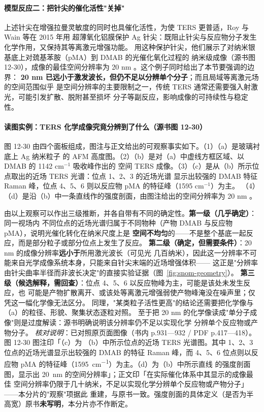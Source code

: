 \paragraph{模型反应二：把针尖的催化活性"关掉"}
上述针尖在增强拉曼灵敏度的同时也具催化活性，为使 TERS 更普适，Roy 与 Wain 等在 2015 年用
超薄氧化铝膜保护 Ag 针尖：既阻止针尖与反应物分子发生化学作用，又保持其等离激元增强功能。
用这种保护针尖，他们展示了对纳米银基底上对巯基苯胺（pMA）到 DMAB 的光催化氧化过程的
纳米级成像（源书图 12-30），成像的最佳空间分辨率为 20 nm
。这个例子同时给出了本节要强调的边界：
\textbf{20 nm 已远小于激发波长，但仍不足以分辨单个分子}；而且局域等离激元场的空间范围似乎
是空间分辨率的主要限制之一，传统 TERS 通常还需要强入射激光，可能引发扩散、脱附甚至损坏
分子等副反应，影响成像的可持续性与稳定性。

\paragraph{读图实例：TERS 化学成像究竟分辨到了什么（源书图 12-30）}
\begin{obs}
图 12-30 由四个面板组成，图注与正文给出的可观察事实如下。（1）（a）是玻璃衬底上 Ag 纳米粒子
的 AFM 高度图。（2）（b）是对（a）中虚线方框区域、以 DMAB 的 1142 cm$^{-1}$ 吸收峰作出的
空间 TERS 成像。（3）（c）是从（b）所示位点取出的近场 TERS 光谱：位点 1、2、3 的近场光谱
显示出较强的 DMAB 特征 Raman 峰，位点 4、5、6 则以反应物 pMA 的特征峰（1595 cm$^{-1}$）为主。
（4）（d）是沿（b）中一条直线作的强度剖面，由图注给出的空间分辨率为 20 nm
。
\end{obs}
\begin{infer}
由以上观察可以作出三级推断，并各自带有不同的确定性。\textbf{第一级（几乎确定）}：同一视场内
不同位点的近场光谱归属于不同物种（产物 DMAB 与反应物 pMA），说明光催化转化在纳米尺度上是
\textbf{空间不均匀}的——不是整个基底一起反应，而是部分粒子或部分位点上发生了反应。
\textbf{第二级（确定，但需要条件）}：20 nm 的成像分辨率\textbf{远小于}所用激光波长（可见光
几百纳米），因此这一分辨率不可能来自光学成像系统本身，只能来自针尖末端的近场增强体积——
这正是"分辨率由针尖曲率半径而非波长决定"的直接实验证据（图~\ref{fig:snom-geometry}）。
\textbf{第三级（候选解释，需回查）}：位点 4、5、6 以反应物峰为主，可能是该处未发生反应，也
可能是产物扩散离开、或该处等离激元增强弱使产物峰淹没在噪声里；仅凭这一幅化学像无法区分。
同理，"某类粒子活性更高"的结论还需要把化学像与（a）的粒径、形貌、聚集状态逐粒对照。
至于把 20 nm 的化学像读成"单分子成像"则是过度解读：源书明确说明该分辨率仍不足以实现化学
分辨单个反应物或产物分子。
\emph{核对说明}：已对照原页面图像（书内 p.931—932 / PDF p.417—418）。图 12-30 图注印「（c）为
（b）中所示位点的近场 TERS 光谱图。其中 1、2、3 位点的近场光谱显示出较强的 DMAB 的特征 Raman
峰，而 4、5、6 位点则以反应物 pMA 的特征峰（\qty{1595}{cm^{-1}}）为主。（d）为（b）中所示直线
的强度剖面图，显示出 \qty{20}{nm} 的空间分辨率」；正文印「在实际催化体系中其显示的成像最佳
空间分辨率仍限于几十纳米，不足以实现化学分辨单个反应物或产物分子」——本分片的"观察"项据此
重建，与原书一致。强度剖面的具体定义（是否为半高宽）原书\textbf{未写明}，本分片亦不作断定。
\end{infer}

